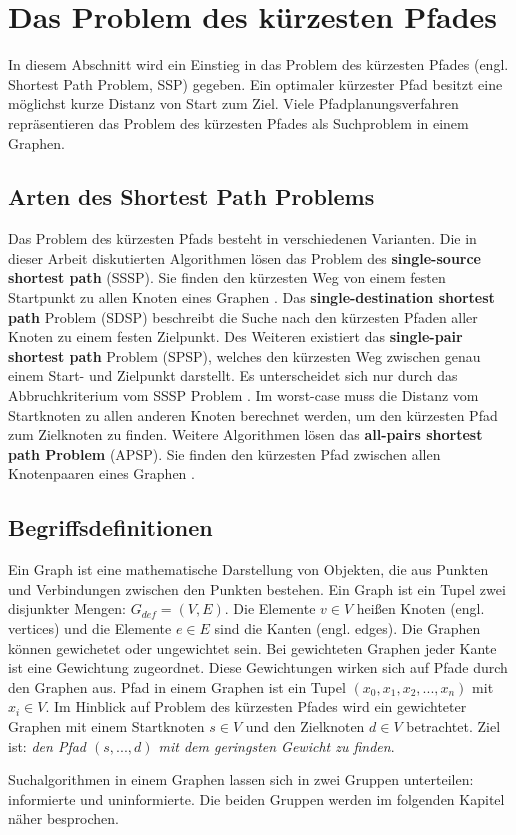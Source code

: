 \chapter{Das Problem des kürzesten Pfades}

In diesem Abschnitt wird ein Einstieg in das Problem des kürzesten Pfades (engl. Shortest Path Problem, SSP) gegeben. Ein optimaler kürzester Pfad besitzt eine möglichst kurze Distanz von Start zum Ziel\cite{Madkour.2017}. Viele Pfadplanungsverfahren repräsentieren das Problem des kürzesten Pfades als Suchproblem in einem Graphen.


\section{Arten des Shortest Path Problems}

Das Problem des kürzesten Pfads besteht in verschiedenen Varianten. Die in dieser Arbeit diskutierten Algorithmen lösen das Problem des \textbf{single-source shortest path} (SSSP). Sie finden den kürzesten Weg von einem festen Startpunkt zu allen Knoten eines Graphen \cite{Gu.2018}. Das \textbf{single-destination shortest path} Problem (SDSP)  beschreibt die Suche nach den kürzesten Pfaden aller Knoten zu einem festen Zielpunkt. Des Weiteren existiert das \textbf{single-pair shortest path} Problem (SPSP), welches den kürzesten Weg zwischen genau einem Start- und Zielpunkt darstellt. Es unterscheidet sich nur durch das Abbruchkriterium vom SSSP Problem \cite{Ottmann.2017}. Im worst-case muss die Distanz vom Startknoten zu allen anderen Knoten berechnet werden, um den kürzesten Pfad zum Zielknoten zu finden. Weitere Algorithmen lösen das \textbf{all-pairs shortest path Problem} (APSP). Sie finden den kürzesten Pfad zwischen allen Knotenpaaren eines Graphen \cite{Cormen.2009}.


\section{Begriffsdefinitionen}

Ein Graph ist eine mathematische Darstellung von Objekten, die aus Punkten und Verbindungen zwischen den Punkten bestehen. Ein Graph ist ein Tupel zwei disjunkter Mengen: $G_{def}= (V,E)$. Die Elemente $v \in V$ heißen Knoten (engl. vertices) und die Elemente $e \in E$ sind die Kanten (engl. edges). Die Graphen können gewichetet oder ungewichtet sein. Bei gewichteten Graphen jeder Kante ist eine Gewichtung zugeordnet. Diese Gewichtungen wirken sich auf Pfade durch den Graphen aus\cite{Gross.2004}. Pfad in einem Graphen ist ein Tupel $\left ( x_{0}, x_{1}, x_{2}, ..., x_{n} \right )$ mit $x_{i} \in V$.  Im Hinblick auf Problem des kürzesten Pfades wird ein gewichteter Graphen mit einem Startknoten $s \in V$ und den Zielknoten $d \in V$ betrachtet. Ziel ist: \textit{den Pfad  $\left ( s, ..., d \right )$ mit dem geringsten Gewicht zu finden}\cite{Madkour.2017}. 



Suchalgorithmen in einem Graphen lassen sich in zwei Gruppen unterteilen:
informierte und uninformierte. Die beiden Gruppen werden im folgenden Kapitel
näher besprochen.